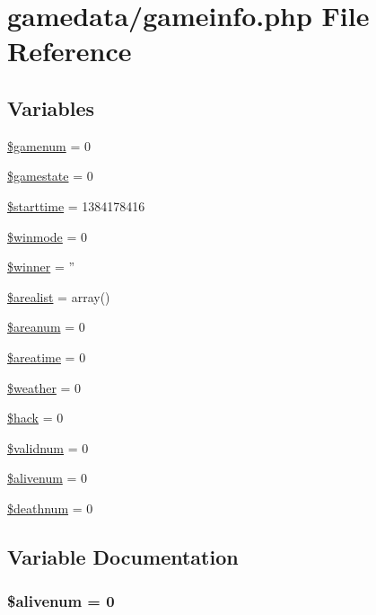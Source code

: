 \hypertarget{gamedata_2gameinfo_8php}{\section{gamedata/gameinfo.php File Reference}
\label{gamedata_2gameinfo_8php}
}
\subsection*{Variables}
\begin{DoxyCompactItemize}
\item 
\hyperlink{gamedata_2gameinfo_8php_a98c5bf2ec517c70a0b24d0486da99fbf}{\$gamenum} = 0
\item 
\hyperlink{gamedata_2gameinfo_8php_a3d9f29a8eb6c28b1e2a35cc7a6c61baa}{\$gamestate} = 0
\item 
\hyperlink{gamedata_2gameinfo_8php_af757b2eb3e5f4761dd88804929e413ea}{\$starttime} = 1384178416
\item 
\hyperlink{gamedata_2gameinfo_8php_afe89a6c5b88f243cfb7699a60ed3e0f3}{\$winmode} = 0
\item 
\hyperlink{gamedata_2gameinfo_8php_ad92744668d7f5e7b2ee5b87fe8a845f2}{\$winner} = ''
\item 
\hyperlink{gamedata_2gameinfo_8php_a692d2363b048bb3fcdb65bf6bde8d9e6}{\$arealist} = array()
\item 
\hyperlink{gamedata_2gameinfo_8php_a23e1b0df49f9669284a6b829a473a53c}{\$areanum} = 0
\item 
\hyperlink{gamedata_2gameinfo_8php_a09c35ae4cf3040a5cd4d20a69f894015}{\$areatime} = 0
\item 
\hyperlink{gamedata_2gameinfo_8php_a7c88c8dfcf14e98d581073a25966ec09}{\$weather} = 0
\item 
\hyperlink{gamedata_2gameinfo_8php_a3403384c1a586a131e24cd874485de0a}{\$hack} = 0
\item 
\hyperlink{gamedata_2gameinfo_8php_a54f1a166645794ce06e05051071a0d53}{\$validnum} = 0
\item 
\hyperlink{gamedata_2gameinfo_8php_af96bde4637269c1f0053ba4ac66a8f87}{\$alivenum} = 0
\item 
\hyperlink{gamedata_2gameinfo_8php_ac8cccc0e21ebd6828150700b1436a5f8}{\$deathnum} = 0
\end{DoxyCompactItemize}


\subsection{Variable Documentation}
\hypertarget{gamedata_2gameinfo_8php_af96bde4637269c1f0053ba4ac66a8f87}{
\subsubsection[{\$alivenum}]{\setlength{\rightskip}{0pt plus 5cm}\$alivenum = 0}}\label{gamedata_2gameinfo_8php_af96bde4637269c1f0053ba4ac66a8f87}


